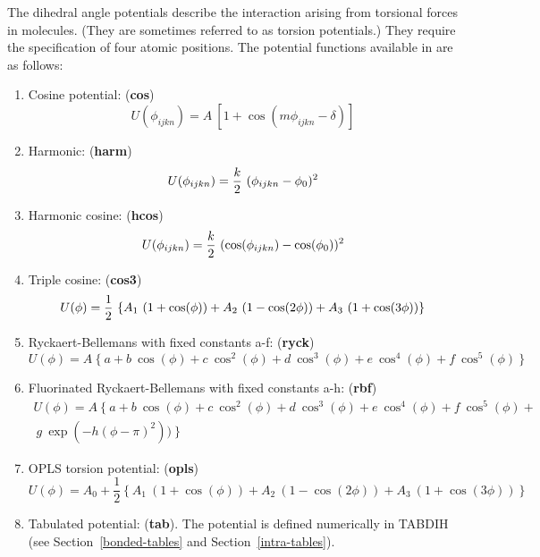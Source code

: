The dihedral angle potentials describe
the interaction arising from torsional forces in molecules.  (They
are sometimes referred to as torsion potentials.)  They require
the specification of four atomic positions.  The potential
functions available in \D are as follows:
\begin{enumerate}
\item Cosine potential:  ({\bf cos})
\begin{equation}
U(\phi_{ijkn}) = A~\left [ 1 + \cos(m\phi_{ijkn} - \delta)\right]
\end{equation}
\item Harmonic:  ({\bf harm})
\begin{equation}
U(\phi_{ijkn}) = {k \over 2}~(\phi_{ijkn} - \phi_{0})^{2}
\end{equation}
\item Harmonic cosine:  ({\bf hcos})
\begin{equation}
U(\phi_{ijkn}) = {k \over 2}~(\cos(\phi_{ijkn}) - \cos(\phi_{0}))^{2}
\end{equation}
\item Triple cosine:  ({\bf cos3})
\begin{equation}
U(\phi) = {1 \over 2}~\{A_{1}~(1+\cos(\phi)) + A_{2}~(1-\cos(2\phi)) + A_{3}~(1+\cos(3\phi))\}
\end{equation}
\item Ryckaert-Bellemans \cite{ryckaert-75a} with fixed constants
a-f: ({\bf ryck})
\begin{equation}
U(\phi) = A~\{~a+b~\cos(\phi)+c~\cos^{2}(\phi)+d~\cos^{3}(\phi)+e~\cos^{4}(\phi)+f~\cos^{5}(\phi)~\}
\end{equation}
\item Fluorinated Ryckaert-Bellemans \cite{schmidt-96a} with fixed
constants a-h:  ({\bf rbf})
\begin{eqnarray}
U(\phi) = A~\{~a+b~\cos(\phi)+c~\cos^{2}(\phi)+d~\cos^{3}(\phi)+e~\cos^{4}(\phi)+f~\cos^{5}(\phi)+ \nonumber \\
~g~\exp(-h(\phi-\pi)^{2}))~\}
\end{eqnarray}
\item OPLS torsion potential:  ({\bf opls})
\begin{equation}
U(\phi)=A_{0}+\frac{1}{2} \left\{ A_{1}~(1+\cos(\phi))+A_{2}~(1-\cos(2\phi))+A_{3}~(1+\cos(3\phi)) \right\}
\end{equation}
\item Tabulated potential:  ({\bf tab}).  The potential is defined numerically in TABDIH (see Section~\ref{bonded-tables} and Section~\ref{intra-tables}).
\end{enumerate}
